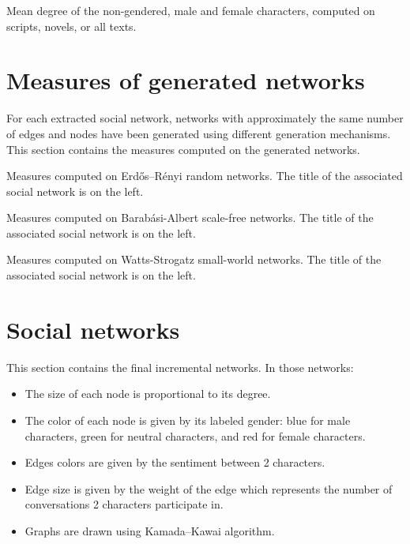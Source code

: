 \documentclass[a4paper, 12pt]{report}
\begin{document}
\begin{appendices}
\begin{table}[]
\caption{Mean degree of the non-gendered, male and female characters, computed on scripts, novels, or all texts. }
\label{gender_degree_all}
\end{table}


\chapter{Measures of generated networks}
\label{measures_generated}
For each extracted social network, networks with approximately the same number of edges and nodes have been generated using different generation mechanisms. This section contains the measures computed on the generated networks.


\begin{table}[]
\caption{Measures computed on Erdős–Rényi random networks. The title of the associated social network is on the left.}
\end{table}


\begin{table}[]
\caption{Measures computed on Barabási-Albert scale-free networks. The title of the associated social network is on the left.}
\end{table}


\begin{table}[]
\caption{Measures computed on Watts-Strogatz small-world networks. The title of the associated social network is on the left.}
\end{table}


\chapter{Social networks}
This section contains the final incremental networks. In those networks:
\begin{itemize}
\item The size of each node is proportional to its degree.
\item The color of each node is given by its labeled gender: blue for male characters, green for neutral characters, and red for female characters.
\item Edges colors are given by the sentiment between 2 characters.
\item Edge size is given by the weight of the edge which represents the number of conversations 2 characters participate in.
\item Graphs are drawn using Kamada–Kawai algorithm.
\end{itemize}
\label{final_sn}



\end{appendices}
\end{document}
